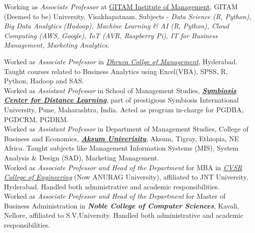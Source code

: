 \documentclass[10pt]{article}
\begin{document}
 Working as \emph{Associate Professor} at \href{https://gim.gitam.edu/}{GITAM Institute of Management}, GITAM (Deemed to be) University, Visakhapatnam. Subjects - \emph{Data Science (R, Python), Big Data Analytics (Hadoop), Machine Learning \& AI (R, Python), Cloud Computing (AWS, Google), IoT (AVR, Raspberry Pi), IT for Business Management, Marketing Analytics.}

 Worked as \textit{Associate Professor} in \textit{\href{http://www.dhruva.ac.in/}{Dhruva Collge of Management}}, Hyderabad. Taught courses related to Business Analytics using Excel(VBA), SPSS, R, Python, Hadoop and SAS. \\

 Worked as \textit{Assistant Professor} in School of Management Studies, \href{http://www.scdl.net/}{\textit{\textbf{Symbiosis Center for Distance Learning}}}, part of prestigious Symbiosis International University, Pune, Maharashtra, India. Acted as program in-charge for PGDBA, PGDCRM, PGDRM. \\

 Worked as \textit{Assistant Professor} in Department of Management Studies, College of Business and Economics, \textit{\textbf{\href{www.aku.edu.et}{Aksum Univerisity}}}, Aksum, Tigray, Ethiopia, NE Africa. Taught subjects like Management Information Systems (MIS), System Analysis \& Design (SAD), Marketing Management. \\

 Worked  as  \textit{Associate Professor and Head of the Department} for MBA	in \emph{\href{http://www.cvsr.ac.in/}{CVSR  College of Engineering}} (Now ANURAG University), affiliated to JNT University, Hyderabad.	Handled both administrative and academic responsibilities. \\

 Worked as \textit{Associate Professor and Head of the Department} for Master of Business Administration  in  \emph{\textbf{Noble College of  Computer Sciences}}, Kavali, Nellore, affiliated to S.V.University. Handled both administrative and academic responsibilities.\\

\begin{comment}
\fbox{$1998 - 2003$} Worked as \emph{Assistant Professor}, Apollo Institute of Hospital Administration (AIHA), Film Nagar, Hyderabad. Taught \emph{statistics, research methodology, healthcare marketing, healthcare informatics}
\end{comment}
\end{document}
